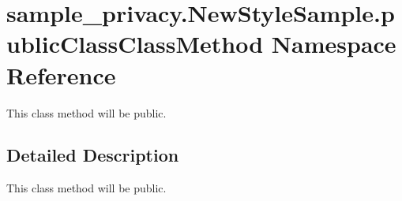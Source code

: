 \hypertarget{namespacesample__privacy_1_1_new_style_sample_1_1public_class_class_method}{\section{sample\-\_\-privacy.\-New\-Style\-Sample.\-public\-Class\-Class\-Method Namespace Reference}
\label{namespacesample__privacy_1_1_new_style_sample_1_1public_class_class_method}
}


This class method will be public.  




\subsection{Detailed Description}
This class method will be public. 